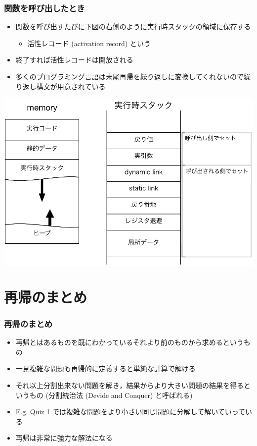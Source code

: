 \begin{frame}[shrink]
\frametitle{関数を呼び出したとき}
  \begin{itemize}
\item 関数を呼び出すたびに下図の右側のように実行時スタックの領域に保存する
    \begin{itemize}
\item 活性レコード (activation record) という
    \end{itemize}
\item 終了すれば活性レコードは開放される
\item 多くのプログラミング言語は末尾再帰を繰り返しに変換してくれないので繰り返し構文が用意されている
  \end{itemize}
  \begin{center}
\includegraphics[scale=0.3]{./Figure/elementaryCS-figMemory}
  \end{center}
\end{frame}
\section{再帰のまとめ}
\begin{frame}[fragile]
\frametitle{再帰のまとめ}
  \begin{itemize}
\item 再帰とはあるものを既にわかっているそれより前のものから求めるというもの
\item 一見複雑な問題も再帰的に定義すると単純な計算で解ける
\item それ以上分割出来ない問題を解き，結果からより大きい問題の結果を得るというもの (分割統治法 (Devide and Conquer) と呼ばれる)
\item E.g. Quiz 1 では複雑な問題をより小さい同じ問題に分解して解いていっている
\item 再帰は非常に強力な解法になる
  \end{itemize}
\end{frame}
